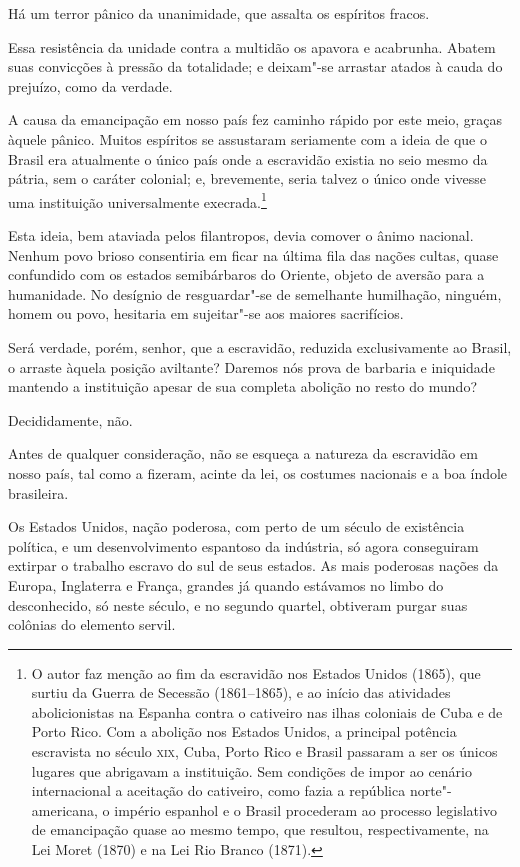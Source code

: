 \begin{linenumbers}

 Há um terror pânico da unanimidade, que assalta os espíritos fracos.

 Essa resistência da unidade contra a multidão os apavora e acabrunha.
Abatem suas convicções à pressão da totalidade; e deixam"-se arrastar
atados à cauda do prejuízo, como da verdade. 

 A causa da emancipação em nosso país fez caminho rápido por este meio,
graças àquele pânico. Muitos espíritos se assustaram seriamente com a
ideia de que o Brasil era atualmente o único país onde a escravidão
existia no seio mesmo da pátria, sem o caráter colonial; e, brevemente,
seria talvez o único onde vivesse uma instituição universalmente
execrada.\footnote{ O autor faz menção ao fim da escravidão nos Estados Unidos (1865), que surtiu
da Guerra de Secessão (1861--1865), e ao início das atividades
abolicionistas na Espanha contra o cativeiro nas ilhas coloniais de
Cuba e de Porto Rico. Com a abolição nos Estados Unidos, a principal
potência escravista no século \textsc{xix}, Cuba, Porto Rico e Brasil passaram a
ser os únicos lugares que abrigavam a instituição. Sem condições de
impor ao cenário internacional a aceitação do cativeiro, como fazia a
república norte"-americana, o império espanhol e o Brasil procederam
ao processo legislativo de emancipação quase ao mesmo tempo, que
resultou, respectivamente, na Lei Moret (1870) e na Lei Rio Branco (1871).}

 Esta ideia, bem ataviada pelos filantropos, devia comover o ânimo
nacional. Nenhum povo brioso consentiria em ficar na última fila das
nações cultas, quase confundido com os estados semibárbaros do Oriente,
objeto de aversão para a humanidade. No desígnio de resguardar"-se de
semelhante humilhação, ninguém, homem ou povo, hesitaria em
sujeitar"-se aos maiores sacrifícios.

 Será verdade, porém, senhor, que a escravidão, reduzida exclusivamente
ao Brasil, o arraste àquela posição aviltante? Daremos nós prova de
barbaria e iniquidade mantendo a instituição apesar de sua completa
abolição no resto do mundo?

 Decididamente, não.

 Antes de qualquer consideração, não se esqueça a natureza da escravidão
em nosso país, tal como a fizeram, acinte da lei, os costumes nacionais
e a boa índole brasileira.

 Os Estados Unidos, nação poderosa, com perto de um século de existência
política, e um desenvolvimento espantoso da indústria, só agora
conseguiram extirpar o trabalho escravo do sul de seus estados. As mais
poderosas nações da Europa, Inglaterra e França, grandes já quando
estávamos no limbo do desconhecido, só neste século, e no segundo
quartel, obtiveram purgar suas colônias do elemento servil.


\end{linenumbers}
